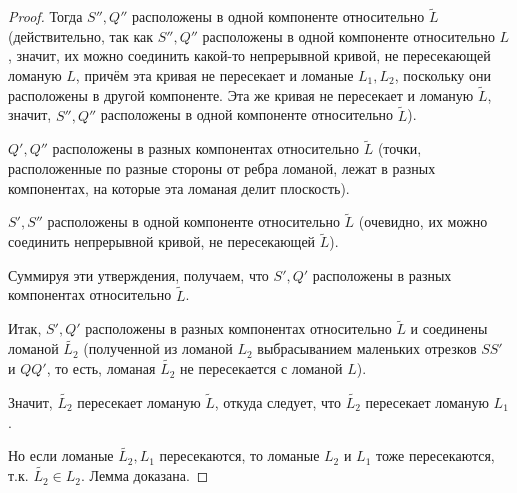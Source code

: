 \begin{proof}
    Тогда $S'', Q''$ расположены в одной компоненте относительно $\tilde{L}$ (действительно, так как $S'', Q''$ расположены в одной компоненте относительно $L$, значит, их можно соединить какой-то непрерывной кривой, не пересекающей ломаную $L$, причём эта кривая не пересекает и ломаные $L_1, L_2$, поскольку они расположены в другой компоненте. Эта же кривая не пересекает и ломаную $\tilde{L}$, значит, $S'', Q''$ расположены в одной компоненте относительно $\tilde{L}$).

    $Q', Q''$ расположены в разных компонентах относительно $\tilde{L}$ (точки, расположенные по разные стороны от ребра ломаной, лежат в разных компонентах, на которые эта ломаная делит плоскость).

    $S', S''$ расположены в одной компоненте относительно $\tilde{L}$ (очевидно, их можно соединить непрерывной кривой, не пересекающей $\tilde{L}$).

    Суммируя эти утверждения, получаем, что $S', Q'$ расположены в разных компонентах относительно $\tilde{L}$.

    Итак, $S', Q'$ расположены в разных компонентах относительно $\tilde{L}$ и соединены ломаной $\tilde{L_2}$ (полученной из ломаной $L_2$ выбрасыванием маленьких отрезков $SS'$ и $QQ'$, то есть, ломаная $\tilde{L_2}$ не пересекается с ломаной $L$).

    Значит, $\tilde{L_2}$ пересекает ломаную $\tilde{L}$, откуда следует, что $\tilde{L_2}$ пересекает ломаную $L_1$. 

    Но если ломаные $\tilde{L_2}, L_1$ пересекаются, то ломаные $L_2$ и $L_1$ тоже пересекаются, т.к. $\tilde{L_2} \in L_2$. Лемма доказана.
\end{proof}

